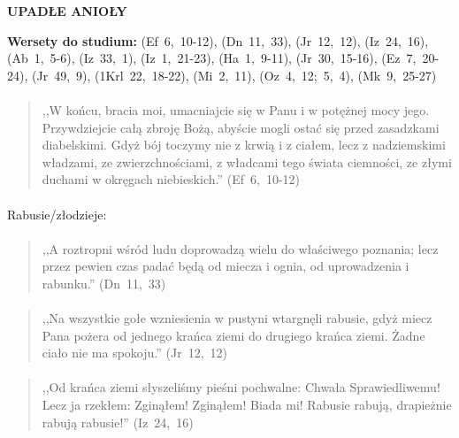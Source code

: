 \documentclass[10pt,a4paper,oneside]{article}
\begin{document}
\centerline{\textbf{\MakeUppercase{Upadłe Anioły}}}
\begin{center}
\textbf{Wersety do studium:} 
\mbox{(Ef 6, 10-12)}, \mbox{(Dn 11, 33)}, \mbox{(Jr 12, 12)}, \mbox{(Iz 24, 16)}, \mbox{(Ab 1, 5-6)}, \mbox{(Iz 33, 1)}, \mbox{(Iz 1, 21-23)}, \mbox{(Ha 1, 9-11)}, \mbox{(Jr 30, 15-16)}, \mbox{(Ez 7, 20-24)}, \mbox{(Jr 49, 9)}, \mbox{(1Krl 22, 18-22)}, \mbox{(Mi 2, 11)}, \mbox{(Oz 4, 12; 5, 4)}, \mbox{(Mk 9, 25-27)}
\end{center}
\paragraph{}
\begin{quote}
,,W końcu, bracia moi, umacniajcie się w Panu i w potężnej mocy jego. Przywdziejcie całą zbroję Bożą, abyście mogli ostać się przed zasadzkami diabelskimi. Gdyż bój toczymy nie z krwią i z ciałem, lecz z nadziemskimi władzami, ze zwierzchnościami, z władcami tego świata ciemności, ze złymi duchami w okręgach niebieskich.'' \mbox{(Ef 6, 10-12)}
\end{quote}
\paragraph{}
Rabusie/złodzieje:
\paragraph{}
\begin{quote}
,,A roztropni wśród ludu doprowadzą wielu do właściwego poznania; lecz przez pewien czas padać będą od miecza i ognia, od uprowadzenia i rabunku.'' \mbox{(Dn 11, 33)}
\end{quote}
\paragraph{}
\begin{quote}
,,Na wszystkie gołe wzniesienia w pustyni wtargnęli rabusie, gdyż miecz Pana pożera od jednego krańca ziemi do drugiego krańca ziemi. Żadne ciało nie ma spokoju.'' \mbox{(Jr 12, 12)}
\end{quote}
\paragraph{}
\begin{quote}
,,Od krańca ziemi słyszeliśmy pieśni pochwalne: Chwała Sprawiedliwemu! Lecz ja rzekłem: Zginąłem! Zginąłem! Biada mi! Rabusie rabują, drapieżnie rabują rabusie!'' \mbox{(Iz 24, 16)}
\end{quote}
\end{document}

